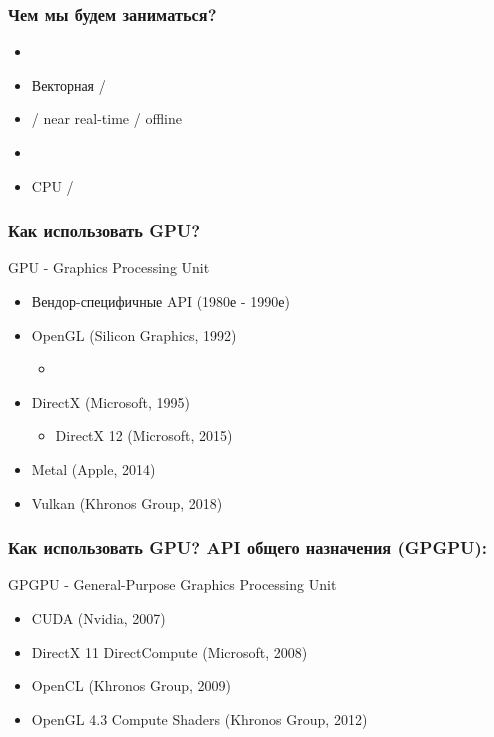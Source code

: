 \documentclass{beamer}
\begin{document}
\begin{frame}
\frametitle{Чем мы будем заниматься?}
\begin{itemize}
\item {}
\item Векторная / 
\item {} / near real-time / offline
\item {}
\item CPU / 
\end{itemize}
\end{frame}

\begin{frame}
\frametitle{Как использовать GPU? }
GPU - Graphics Processing Unit
\pause
\pause
\begin{itemize}
\item Вендор-специфичные API (1980е - 1990е)
\pause
\item OpenGL (Silicon Graphics, 1992)
\pause
\begin{itemize}
\item {}
\end{itemize}
\pause
\item DirectX (Microsoft, 1995)
\pause
\begin{itemize}
\item {DirectX 12 (Microsoft, 2015)}
\end{itemize}
\pause
\item {\only<10->{\color{red}}Metal (Apple, 2014)}
\pause
\item {Vulkan (Khronos Group, 2018)}
\end{itemize}
\end{frame}

\begin{frame}
\frametitle{Как использовать GPU? API общего назначения (GPGPU):}
GPGPU - General-Purpose Graphics Processing Unit
\pause
\begin{itemize}
\item CUDA (Nvidia, 2007)
\pause
\item DirectX 11 DirectCompute (Microsoft, 2008)
\pause
\item OpenCL (Khronos Group, 2009)
\pause
\item OpenGL 4.3 Compute Shaders (Khronos Group, 2012)
\end{itemize}
\end{frame}
\end{document}
